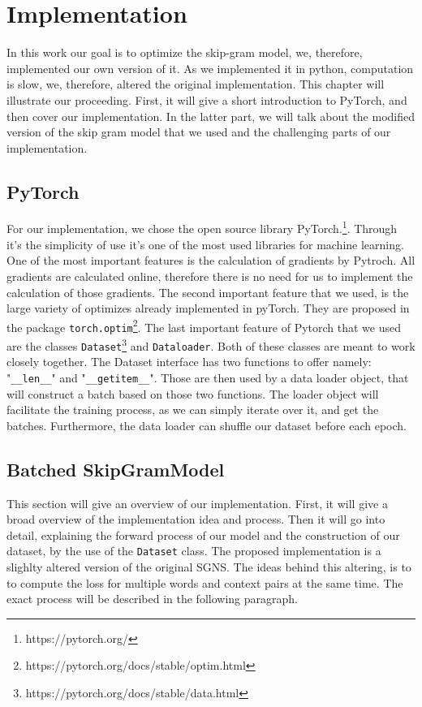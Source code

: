 \chapter{Implementation}\label{chap:implementation}

In this work our goal is to optimize the skip-gram model, we, therefore, implemented our own version of it. As we implemented it in python, computation is slow, we, therefore, altered the original implementation. 
This chapter will illustrate our proceeding. First, it will give a short introduction to PyTorch, and then cover our implementation. In the latter part, we will talk about the modified version of the skip gram model that we used and the challenging parts of our implementation.
\section{PyTorch}
For our implementation, we chose the open source library PyTorch.\footnote{https://pytorch.org/}. Through it's the simplicity of use it's one of the most used libraries for machine learning. One of the most important features is the calculation of gradients by Pytroch. All gradients are calculated online, therefore there is no need for us to implement the calculation of those gradients. The second important feature that we used, is the large variety of optimizes already implemented in pyTorch. They are proposed in the package \texttt{torch.optim}\footnote{https://pytorch.org/docs/stable/optim.html}. The last important feature of Pytorch that we used are the classes \texttt{Dataset}\footnote{\label{note_data}https://pytorch.org/docs/stable/data.html} and \texttt{Dataloader}\footnotemark[\ref{note_data}]. Both of these classes are meant to work closely together.   The Dataset interface has two functions to offer namely: "\texttt{\_\_len\_\_}" and "\texttt{\_\_getitem\_\_}". Those are then used by a data loader object, that will construct a batch based on those two functions. The loader object will facilitate the training process, as we can simply iterate over it, and get the batches. Furthermore, the data loader can shuffle our dataset before each epoch. 

\section{Batched SkipGramModel} \label{ssec:b_SGM}
This section will give an overview of our implementation. First, it will give a broad overview of the implementation idea and process. Then it will go into detail, explaining the forward process of our model and the construction of our dataset, by the use of the \texttt{Dataset} class. The proposed implementation is a slighlty altered version of the original SGNS. The ideas behind this altering, is to to compute the loss for multiple words and context pairs at the same time. The exact process will be described in the following paragraph. 
